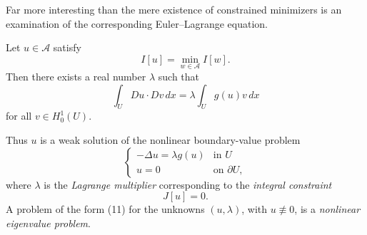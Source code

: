 Far more interesting than the mere existence of constrained minimizers is an examination of the corresponding Euler--Lagrange equation.

\begin{theorem}
\label{thm:lagrange-multiplier-nonlinear-eigenvalue}
Let $u \in \mathcal{A}$ satisfy
\[
I[u] = \min_{w \in \mathcal{A}} I[w].
\tag{9}
\]
Then there exists a real number $\lambda$ such that
\[
\int_U Du \cdot Dv\, dx = \lambda \int_U g(u)v\, dx
\tag{10}
\]
for all $v \in H_0^1(U)$.
\end{theorem}

\begin{remark}
\label{rem:nonlinear-eigenvalue-lagrange-multiplier-interpretation}
Thus $u$ is a weak solution of the nonlinear boundary-value problem
\[
\begin{cases}
-\Delta u = \lambda g(u) & \text{in } U \\
u = 0 & \text{on } \partial U,
\end{cases}
\tag{11}
\]
where $\lambda$ is the \textit{Lagrange multiplier} corresponding to the \textit{integral constraint}
\[
J[u] = 0.
\tag{12}
\]
A problem of the form (11) for the unknowns $(u,\lambda)$, with $u \not\equiv 0$, is a \textit{nonlinear eigenvalue problem}.
\end{remark}

